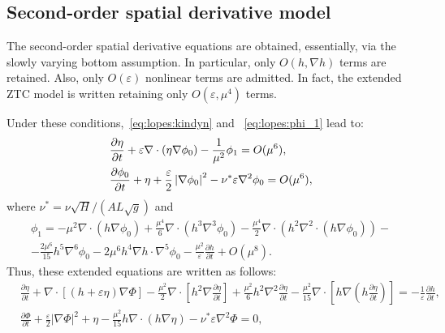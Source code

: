 \subsection{Second-order spatial derivative model}
The  second-order  spatial derivative equations
 are obtained, essentially, via the
slowly varying bottom assumption. In particular, only
$O(h,\nabla h)$ terms are retained.  Also, only $O(\varepsilon)$
nonlinear terms are admitted.  In fact,
the extended ZTC model is written retaining only
$O(\varepsilon,\mu^4)$ terms.

Under these conditions,~\eqref{eq:lopes:kindyn} and
~\eqref{eq:lopes:phi_1} lead to:
\begin{subequations}\label{eq:lopes:kindyn2}
\begin{align}
&\displaystyle\frac{\partial \eta}{\partial t}+\varepsilon\nabla\cdot(\eta\nabla\phi_0)
-\frac{1}{\mu^2}\phi_1=O(\mu^{6}),\vspace{0.3cm}\label{eq:lopes:kindyn2-a}
\\
&\displaystyle\frac{\partial \phi_0}{\partial t}+\eta + \frac{\varepsilon}{2}
\left|\nabla\phi_0\right|^2-\nu^*\varepsilon\nabla^2\phi_0
=O(\mu^{6}),\label{eq:lopes:kindyn2-b}
\end{align}
\end{subequations}
where $\nu^*=\nu\sqrt{H}/(AL\sqrt{g})$
and
\begin{multline}\label{eq:lopes:phi_2}
\phi_1= -\mu^{2}\nabla\cdot\left(h\nabla\phi_0\right)
+\frac{\mu^{4}}{6}\nabla\cdot\left(h^3\nabla^3\phi_0\right)
-\frac{\mu^{4}}{2}\nabla\cdot\left(h^2
\nabla^2\cdot\left(h\nabla\phi_0\right)
\right)-\\ -\frac{2\mu^6}{15}h^5\nabla^6\phi_0-2\mu^6h^4\nabla
h\cdot\nabla^5\phi_0
-\frac{\mu^2}{\varepsilon}\frac{\partial h}{\partial t}+O(\mu^{8}).
\end{multline}
Thus, these extended equations are written as follows:
\begin{subequations}\label{eq:lopes:ztcdimensionless}
\begin{align}
&\frac{\partial\eta}{\partial t}
  +\nabla\cdot[(h+\varepsilon\eta)\nabla{\Phi}] -\frac{\mu^2}{2}\nabla\cdot
  [h^{2}\nabla\frac{\partial \eta} {\partial t}]
  +\frac{\mu^2}{6}h^{2}\nabla^2\frac{\partial\eta}{\partial t}
  -\frac{\mu^2}{15}\nabla\cdot[h\nabla(h\frac{\partial\eta}
    {\partial
      t})]=-\frac{1}{\varepsilon}\frac{\partial h}{\partial t}, \label{eq:lopes:ztcdimensionless-a}\\ &\frac{\partial
    \Phi}{\partial t} +\frac{\varepsilon}{2}|\nabla\Phi|^2+\eta-
  \frac{\mu^2}{15}h\nabla\cdot(h\nabla\eta)-\nu^*\varepsilon\nabla^2\Phi
=0, \label{eq:lopes:ztcdimensionless-b}
\end{align}
\end{subequations}
